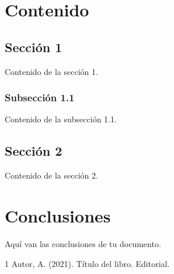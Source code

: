 \documentclass[12pt]{report}
\begin{document}
\chapter{Contenido}
\section{Sección 1}
Contenido de la sección 1. \cite{1}

\subsection{Subsección 1.1}
Contenido de la subsección 1.1.

\section{Sección 2}
Contenido de la sección 2.
\newpage

\chapter{Conclusiones}
Aquí van las conclusiones de tu documento.
\newpage

\begin{thebibliography}{1}
 Autor, A. (2021). Título del libro. Editorial.
\end{thebibliography}
\end{document}
